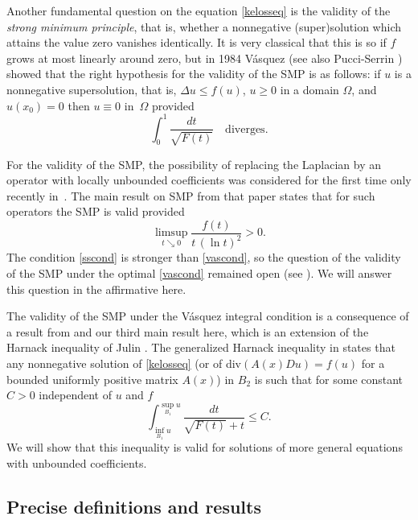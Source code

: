 \documentclass[12pt,a4paper]{amsart}
\numberwithin{equation}{section} %
\theoremstyle{definition}
\theoremstyle{remark}
\begin{document}
Another fundamental question on the equation \eqref{kelosseq} is the validity of the {\it strong minimum principle}, that is, whether a nonnegative (super)solution which attains the value zero vanishes identically. It is very classical that this is so if $f$ grows at most linearly around zero, but in 1984 V\'asquez \cite{V84} (see also Pucci-Serrin \cite{PS00}) showed that the right hypothesis for the validity of the SMP is as follows: if $u$ is a nonnegative supersolution, that is, $\Delta u \le f(u)$, $u\ge0$ in a domain $\Omega$, and $u(x_0)=0$ then $u\equiv 0$ in~$\Omega$ provided 
\begin{equation}\label{vascond}
 \int_{0}^1 \frac{dt}{\sqrt{F(t)}} \quad\mbox{diverges}.
\end{equation} 

For the validity of the SMP, the possibility of replacing the Laplacian by an operator with locally unbounded coefficients was considered for the first time only recently in~\cite{SS21}. The main result on SMP from that paper states that for such operators the SMP is valid provided 
\begin{equation}\label{sscond}
 \limsup_{t\searrow 0} \frac{f(t)}{t\,(\ln t)^2}>0.
\end{equation} 
The condition \eqref{sscond} is stronger than \eqref{vascond}, so the question of the validity of the SMP under the optimal \eqref{vascond} remained open (see \cite[p.4-5]{SS21}). We will answer this question in the affirmative here. 
\smallskip 

The validity of the SMP under the V\'asquez integral condition is a consequence of a result from \cite{SS21} and our third main result here, which is an extension of the Harnack inequality of Julin \cite{VJ1}. The generalized Harnack inequality in \cite{VJ1} states that any nonnegative solution of \eqref{kelosseq} (or of div$(A(x)Du)=f(u)$ for a bounded uniformly positive matrix $A(x)$) in $B_2$ is such that for some constant $C>0$ independent of $u$ and $f$ 
\begin{equation}\label{julin}
    \int_{\inf_{B_1} u}^{\sup_{B_1} u} \frac{dt}{\sqrt{F(t)} + t} \leq C.
\end{equation}
We will show that this inequality is valid for solutions of more general equations with unbounded coefficients. 


\subsection{Precise definitions and results} 
\end{document}
